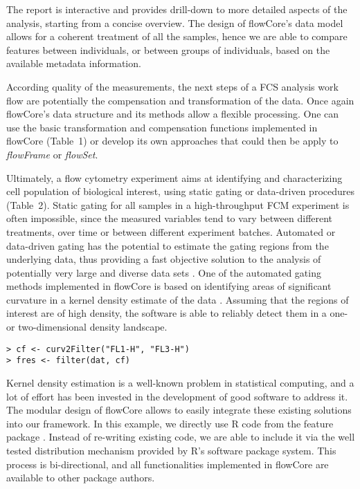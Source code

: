\documentclass[10pt]{bmc_article}
\newcommand{\Rpackage}[1]{{\textsf{#1}}}
\newcommand{\Rclass}[1]{{\textit{#1}}}
\newenvironment{bmcformat}{\begin{raggedright}\baselineskip20pt\sloppy\setboolean{publ}{false}}{\end{raggedright}\baselineskip20pt\sloppy}
\begin{document}
\begin{bmcformat}
The report is interactive and provides drill-down to more detailed
aspects of the analysis, starting from a concise overview. The design
of \Rpackage{flowCore}'s data model allows for a coherent treatment of
all the samples, hence we are able to compare features between
individuals, or between groups of individuals, based on the available
metadata information.


According quality of the measurements, the next steps of a FCS
analysis work flow are potentially the compensation and transformation
of the data. Once again \Rpackage{flowCore}'s data structure and its
methods allow a flexible processing. One can use the basic
transformation and compensation functions implemented in
\Rpackage{flowCore} (Table~1) or develop its own approaches that could
then be apply to \Rclass{flowFrame} or \Rclass{flowSet}.

Ultimately, a flow cytometry experiment aims at identifying and
characterizing cell population of biological interest, using static
gating or data-driven procedures (Table~2). Static gating for all
samples in a high-throughput FCM experiment is often impossible, since
the measured variables tend to vary between different treatments, over
time or between different experiment batches. Automated or data-driven
gating has the potential to estimate the gating regions from the
underlying data, thus providing a fast objective solution to the
analysis of potentially very large and diverse data sets
\cite{lo2008agf}. One of the automated gating methods implemented in
\Rpackage{flowCore} is based on identifying areas of significant
curvature in a kernel density estimate of the data
\cite{wand2008}. Assuming that the regions of interest are of high
density, the software is able to reliably detect them in a one- or
two-dimensional density landscape.

\begin{verbatim}
> cf <- curv2Filter("FL1-H", "FL3-H")
> fres <- filter(dat, cf)
\end{verbatim}

Kernel density estimation is a well-known problem in statistical
computing, and a lot of effort has been invested in the development of
good software to address it. The modular design of \Rpackage{flowCore}
allows to easily integrate these existing solutions into our
framework. In this example, we directly use R code from the
\Rpackage{feature} package \cite{wand2008}. Instead of
re-writing existing code, we are able to include it via the well
tested distribution mechanism provided by R's software package
system. This process is bi-directional, and all functionalities
implemented in \Rpackage{flowCore} are available to other package
authors.


\end{bmcformat}
\end{document}
